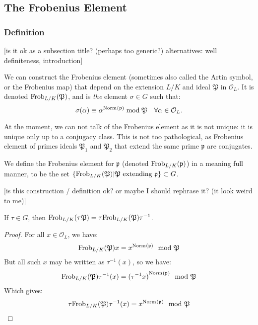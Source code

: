 \subsection{The Frobenius Element}
\subsubsection{Definition}
[is it ok as a subsection title? (perhaps too generic?) alternatives: well definiteness, introduction]

We can construct the Frobenius element (sometimes also called the Artin symbol, or the Frobenius map) that depend on the extension $L/K$ and ideal $\mathfrak{P}$ in $\mathcal{O}_L$.
It is denoted $\text{Frob}_{L/K}(\mathfrak{P})$, and is \textit{the} element $\sigma \in G$ such that:
$$
\sigma(\alpha) \equiv \alpha^{\text{Norm}_{}(\mathfrak{p})} \bmod{\mathfrak{P}} \quad \forall \alpha \in \mathcal{O}_L.
$$

At the moment, we can not talk of the Frobenius element as it is not unique: it is unique only up to a conjugacy class.
This is not too pathological, as Frobenius element of primes ideals $\mathfrak{P}_1$ and $\mathfrak{P}_2$ that extend the same prime $\mathfrak{p}$ are conjugates.

We define the Frobenius element for $\mathfrak{p}$ (denoted $\text{Frob}_{L/K}(\mathfrak{p})$) in a meaning full manner, to be the set 
$
\{ \text{Frob}_{L/K}(\mathfrak{P}) | \mathfrak{P} 
\text{ extending } \mathfrak{p} \} \subset G
$.

[is this construction / definition ok? or maybe I should rephrase it? (it look weird to me)]

\begin{property}
	If $\tau \in G$, then 
	$\text{Frob}_{L/K}(\mathfrak{\tau P}) = \tau \text{Frob}_{L/K}(\mathfrak{P}) \tau^{-1}$.
\end{property}
\begin{proof}
	For all $x \in \mathcal{O}_L$, we have:
	$$
	\text{Frob}_{L/K}(\mathfrak{P})x 
	= x^{\text{Norm}_{}(\mathfrak{p})} \mod \mathfrak{P}
	$$
	But all such $x$ may be written as $\tau^{-1}(x)$, so we have:
	$$
	\text{Frob}_{L/K}(\mathfrak{P}) \tau^{-1}(x) 
	= {(\tau^{-1} x)}^{\text{Norm}_{}(\mathfrak{p})} \mod \mathfrak{P}
	$$
	Which gives:
	$$
	\tau \text{Frob}_{L/K}(\mathfrak{P})\tau^{-1}(x) 
	= x^{\text{Norm}_{}(\mathfrak{p})} \mod \mathfrak{P}
	$$
\end{proof}


